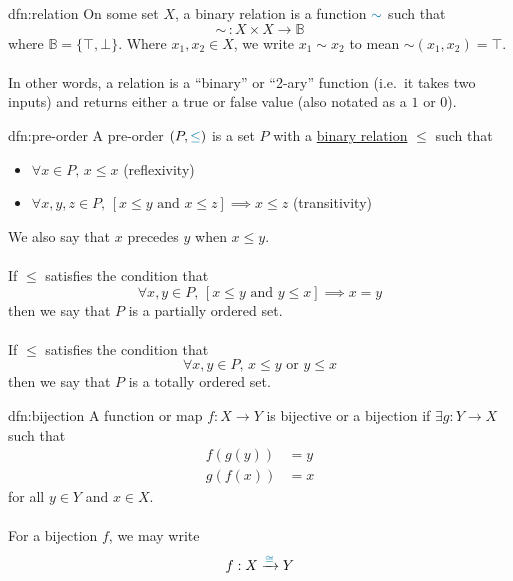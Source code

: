\begin{dfn}[Relation]{dfn:relation}
    On some set \( X \), a \textcolor{dfn-color}{binary relation} is a function \( \textcolor{dfn-color}{\sim} \) such that
    \[
        \sim \, : X \times X \to \mathbb{B}
    \]
    where \( \mathbb{B} = \{ \top, \bot \} \).
    Where \( x_1, x_2 \in X \), we write \( x_1 \sim x_2 \) to mean \( \sim(x_1, x_2) = \top \).
    \\ \\
    In other words, a relation is a ``binary'' or ``2-ary'' function (i.e.\ it takes two inputs) and returns either a true or false value (also notated as a \( 1 \) or \( 0 \)).
\end{dfn}
\newpage
\begin{dfn}{dfn:pre-order}
    A \textcolor{dfn-color}{pre-order} \( (P, \textcolor{dfn-color}{\leq}) \) is a set \( P \) with a \hyperref[dfn:relation]{binary relation} \( \leq \) such that
    \begin{itemize}
        \item \( \forall x \in P, \, x \leq x \) (reflexivity)
        \item \( \forall x, y, z \in P, \, [x \leq y \text{ and } x \leq z] \implies x \leq z \) (transitivity)
    \end{itemize}
    We also say that \( x \) \textcolor{dfn-color}{precedes} \( y \) when \( x \leq y \).
    \\ \\
    If \( \leq \) satisfies the condition that
    \[
        \forall x, y \in P, \, [x \leq y \text{ and } y \leq x] \implies x = y
    \]
    then we say that \( P \) is a \textcolor{dfn-color}{partially ordered set}.
    \\ \\
    If \( \leq \) satisfies the condition that
    \[
        \forall x, y \in P, \, x \leq y \text{ or } y \leq x
    \]
    then we say that \( P \) is a \textcolor{dfn-color}{totally ordered set}.
\end{dfn}

\begin{dfn}{dfn:bijection}
    A function or map \( f : X \to Y \) is \textcolor{dfn-color}{bijective} or \textcolor{dfn-color}{a bijection} if \( \exists g : Y \to X \) such that
    \begin{align*}
        f(g(y)) &= y \\
        g(f(x)) &= x
    \end{align*}
    for all \( y \in Y \) and \( x \in X \).
    \\ \\
    For a bijection \( f \), we may write
    \[
        f : X \xrightarrow{\textcolor{dfn-color}{\cong}} Y
    \]
\end{dfn}

